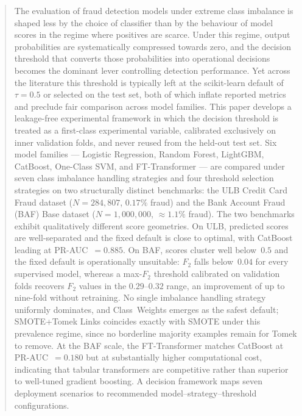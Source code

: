 \documentclass[a4paper,fleqn]{cas-sc}
\begin{document}
\begin{abstract}
The evaluation of fraud detection models under extreme class imbalance is shaped less
by the choice of classifier than by the behaviour of model scores in the regime where
positives are scarce. Under this regime, output probabilities are systematically
compressed towards zero, and the decision threshold that converts those probabilities
into operational decisions becomes the dominant lever controlling detection performance.
Yet across the literature this threshold is typically left at the scikit-learn default
of~$\tau=0.5$ or selected on the test set, both of which inflate reported metrics and
preclude fair comparison across model families.
This paper develops a leakage-free experimental framework in which the decision threshold
is treated as a first-class experimental variable, calibrated exclusively on inner
validation folds, and never reused from the held-out test set.
Six model families --- Logistic Regression, Random Forest, LightGBM, CatBoost,
One-Class SVM, and FT-Transformer --- are compared under seven class imbalance handling
strategies and four threshold selection strategies on two structurally distinct
benchmarks: the ULB Credit Card Fraud dataset ($N\!=\!284{,}807$, $0.17\%$ fraud) and
the Bank Account Fraud (BAF) Base dataset ($N\!=\!1{,}000{,}000$, ${\approx}1.1\%$ fraud).
The two benchmarks exhibit qualitatively different score geometries.
On ULB, predicted scores are well-separated and the fixed default is close to optimal,
with CatBoost leading at PR-AUC~$=\!0.885$.
On BAF, scores cluster well below~$0.5$ and the fixed default is operationally unsuitable:
$F_2$ falls below~$0.04$ for every supervised model, whereas a max-$F_2$ threshold
calibrated on validation folds recovers $F_2$ values in the $0.29$--$0.32$ range, an
improvement of up to nine-fold without retraining.
No single imbalance handling strategy uniformly dominates, and Class~Weights emerges as
the safest default; SMOTE+Tomek Links coincides exactly with SMOTE under this prevalence
regime, since no borderline majority examples remain for Tomek to remove.
At the BAF scale, the FT-Transformer matches CatBoost at PR-AUC~$=\!0.180$ but at
substantially higher computational cost, indicating that tabular transformers are
competitive rather than superior to well-tuned gradient boosting.
A decision framework maps seven deployment scenarios to recommended
model--strategy--threshold configurations.
\end{abstract}

\end{document}
